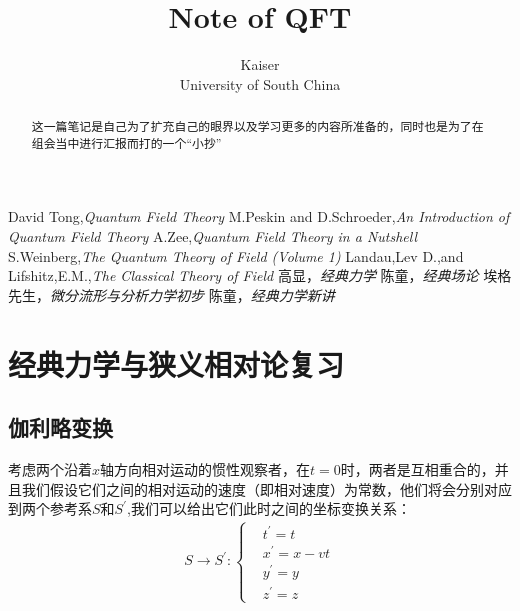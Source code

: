 \documentclass{article}
\title{Note of QFT}
\author{Kaiser\\University of South China}
\begin{document}
\maketitle

\begin{abstract}
    \normalsize
    这一篇笔记是自己为了扩充自己的眼界以及学习更多的内容所准备的，同时也是为了在组会当中进行汇报而打的一个“小抄”
\end{abstract}

\begin{center}
    \large
    \begin{thebibliography}{99} 
         David Tong,\textit{Quantum Field Theory}
         M.Peskin and D.Schroeder,\textit{An Introduction of Quantum Field Theory}
         A.Zee,\textit{Quantum Field Theory in a Nutshell}
         S.Weinberg,\textit{The Quantum Theory of Field (Volume 1)}
         Landau,Lev D.,and Lifshitz,E.M.,\textit{The Classical Theory of Field}
         高显，\textit{经典力学}
         陈童，\textit{经典场论}
         埃格先生，\textit{微分流形与分析力学初步}
         陈童，\textit{经典力学新讲}
    \end{thebibliography}
\end{center}




\begin{center}
    \tableofcontents
\end{center}
\newpage





\section{经典力学与狭义相对论复习}

\subsection{伽利略变换}
考虑两个沿着$x$轴方向相对运动的惯性观察者，在$t=0$时，两者是互相重合的，并且我们假设它们之间的相对运动的速度（即相对速度）为常数，他们将会分别对应到两个参考系$S$和$S^\prime$,我们可以给出它们此时之间的坐标变换关系：
\begin{align*}
    S\to S^\prime:
    \begin{cases}
        &t^\prime=t\\
        &x^\prime=x-vt\\
        &y^\prime=y\\
        &z^\prime=z
    \end{cases}
\end{align*}
\end{document}
